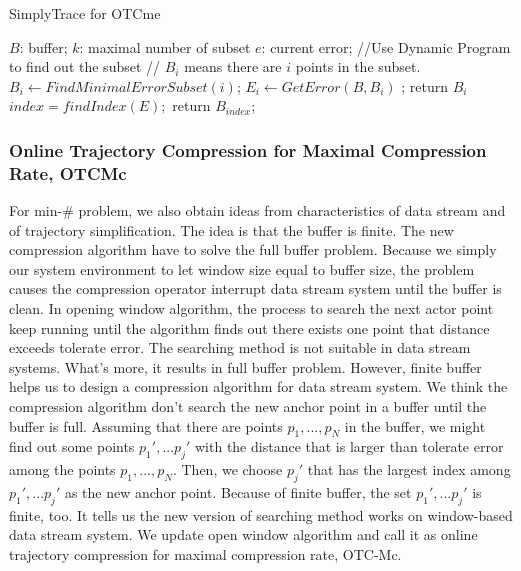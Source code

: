 \documentclass[12pt]{article}
\begin{document}
\begin{CJK}{UTF8}{bsmi}
\begin{algorithm}[h]
  \caption{SimplyTrace for OTCme}
  \begin{algorithmic}[2]
  \Require
   	  $B$: buffer;
	  $k$: maximal number of subset
      $e$: current error;
   \Ensure
	    \State //Use Dynamic Program to find out the subset
	    \State // $B_{i}$ means there are $i$ points in the subset.
		\State $B_{i} \gets FindMinimalErrorSubset(i)$; 	
		\State $E_{i} \gets GetError(B,B_{i})$ ;
			\State return $B_{i}$
		\EndIf
      \EndFor
      \State $index = findIndex(E);$
      \State return $B_{index}$;
 
  \end{algorithmic}
\end{algorithm}

\subsubsection{Online Trajectory Compression for Maximal Compression Rate, OTCMc}



For min-$\#$ problem, we also obtain ideas from characteristics of data stream and of trajectory simplification. The idea is that the buffer is finite. The new compression algorithm have to solve the full buffer problem. Because we simply our system environment to let window size equal to buffer size, the problem causes the compression operator interrupt data stream system until the buffer is clean. In opening window algorithm, the process to search the next actor point keep running until the algorithm finds out there exists one point that distance exceeds tolerate error. The searching method is not suitable in data stream systems. What's more, it results in full buffer problem. However, finite buffer helps us to design a compression algorithm for data stream system.  We think the compression algorithm don't search the new anchor point in a buffer until the buffer is full. Assuming that there are points ${p_1,...,p_N}$ in the buffer, we might find out some points ${p_1',...p_j'}$ with the distance that is larger than tolerate error among the points ${p_1,...,p_N}$. Then, we choose $p_j'$ that has the largest index among ${p_1',...p_j'}$ as the new anchor point. Because of finite buffer, the set ${p_1',...p_j'}$ is finite, too. It tells us the new version of searching method works on window-based data stream system. We update open window algorithm and call it as online trajectory compression for maximal compression rate, OTC-Mc.


\end{CJK}
\end{document}
